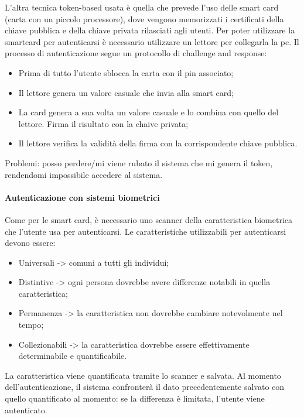 L'altra tecnica token-based usata è quella che prevede l'uso delle smart card (carta con un piccolo processore), dove vengono memorizzati i certificati della chiave pubblica e della chiave privata rilasciati agli utenti. Per poter utilizzare la smartcard per autenticarsi è necessario utilizzare un lettore per collegarla la pc. Il processo di autenticazione segue un protocollo di challenge and response: 
\begin{itemize}
    \item Prima di tutto l'utente sblocca la carta con il pin associato;
    \item Il lettore genera un valore casuale che invia alla smart card;
    \item La card genera a sua volta un valore casuale e lo combina con quello del lettore. Firma il risultato con la chaive privata;
    \item Il lettore verifica la validità della firma con la corrispondente chiave pubblica.
\end{itemize}

\noindent Problemi: posso perdere/mi viene rubato il sistema che mi genera il token, rendendomi impossibile accedere al sistema. 

\paragraph{Autenticazione con sistemi biometrici} Come per le smart card, è necessario uno scanner della caratteristica biometrica che l'utente usa per autenticarsi. 
Le caratteristiche utilizzabili per autenticarsi devono essere:
\begin{itemize}
    \item Universali -> comuni a tutti gli individui;
    \item Distintive -> ogni persona dovrebbe avere differenze notabili in quella caratteristica;
    \item Permanenza -> la caratteristica non dovrebbe cambiare notevolmente nel tempo;
    \item Collezionabili -> la caratteristica dovrebbe essere effettivamente determinabile e quantificabile.
\end{itemize}

\noindent La caratteristica viene quantificata tramite lo scanner e salvata. Al momento dell'autenticazione, il sistema confronterà il dato precedentemente salvato con quello quantificato al momento: se la differenza è limitata, l'utente viene autenticato.


